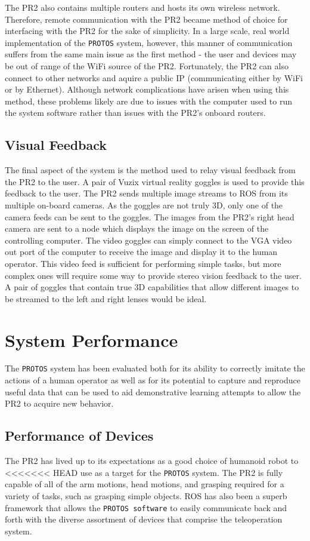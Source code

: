 \documentclass{sig-alternate}
\begin{document}
\indent The PR2 also contains multiple routers and hosts its
own wireless network. Therefore, remote communication with the PR2 became method of choice for interfacing
with the PR2 for the sake of simplicity. In a large scale, real world implementation of the {\tt PROTOS} system, however,
this manner of communication suffers from the same main issue as the first method - the user and devices
may be out of range of the WiFi source of the PR2. Fortunately,
the PR2 can also connect to other networks and aquire a public IP
(communicating either by WiFi or by
Ethernet). Although network complications have arisen when using this method,
these problems likely are due to issues with the computer used to run the system software 
rather than issues with the PR2's onboard routers.

\subsection{Visual Feedback}
\indent The final aspect of the system is the method used to relay visual feedback from the PR2 to the user.
A pair of  Vuzix virtual reality goggles is used to provide this feedback to the user. The PR2 sends multiple image 
streams to ROS from its multiple on-board cameras. As the goggles are not truly 3D, only one of the camera feeds
can be sent to the goggles. The images from the PR2's right head camera are sent to a node which displays the image
on the screen of the controlling computer. The video goggles can simply connect
to the VGA video out port of the computer to
receive the image and display it to the human operator. This video feed is sufficient
for performing simple tasks, but more complex ones will require some way to provide stereo vision feedback
to the user. A pair of goggles that contain true 3D capabilities that allow different images to be streamed
to the left and right lenses would be ideal.

\section{System Performance}
\label{sec:system_performance}
\indent The {\tt PROTOS} system has been evaluated both for its ability to correctly
imitate the actions of a human operator as well as for its potential 
to capture and reproduce useful data that can be used to aid demonstrative learning
attempts to allow the PR2 to acquire new behavior.

\subsection{Performance of Devices}
\indent The PR2 has lived up to its expectations as a good choice of humanoid robot to 
<<<<<<< HEAD
use as a target for the {\tt PROTOS} system. The 
PR2 is fully capable of all of the arm motions, head motions, and grasping
required for a variety of tasks, such as grasping simple objects. ROS has also been a superb framework that allows the 
{\tt PROTOS software} to easily communicate back and forth with the diverse 
assortment of devices that comprise the teleoperation system.
\end{document}
